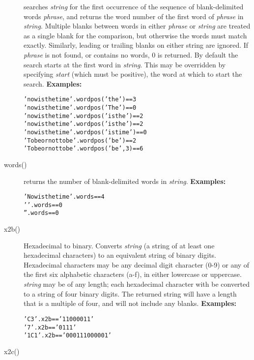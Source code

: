 \begin{description}
searches \emph{string} for the first occurrence of the sequence
of blank-delimited words \emph{phrase}, and returns the word number
of the first word of \emph{phrase} in \emph{string}.  Multiple
blanks between words in either \emph{phrase} or \emph{string}
are treated as a single blank for the comparison, but otherwise the
words must match exactly.  Similarly, leading or trailing blanks on
either string are ignored.
If \emph{phrase} is not found, or contains no words, 0 is returned.
 By default the search starts at the first word in \emph{string}.
This may be overridden by specifying \emph{start} (which must be
positive), the word at which to start the search.
 \textbf{Examples:}
\begin{alltt}
'now is the time'.wordpos('the')       == 3
'now is the time'.wordpos('The')       == 0
'now is the time'.wordpos('is the')    == 2
'now is the time'.wordpos('is    the') == 2
'now is the time'.wordpos('is  time')  == 0
'To be or not to be'.wordpos('be')     == 2
'To be or not to be'.wordpos('be',3)   == 6
\end{alltt}
\item[words()]\label{refwords}

returns the number of blank-delimited words in \emph{string}.
 \textbf{Examples:}
\begin{alltt}
'Now is the time'.words == 4
' '.words               == 0
''.words                == 0
\end{alltt}
\item[x2b()]\label{refx2b}

Hexadecimal to binary.
Converts \emph{string} (a string of at least one hexadecimal
characters) to an equivalent string of binary digits.
Hexadecimal characters may be any decimal digit character (0-9) or any
of the first six alphabetic characters (a-f), in either lowercase or
uppercase.
 \emph{string} may be of any length; each hexadecimal character
with be converted to a string of four binary digits.
The returned string will have a length that is a multiple of four, and
will not include any blanks.
 \textbf{Examples:}
\begin{alltt}
'C3'.x2b  == '11000011'
'7'.x2b   == '0111'
'1C1'.x2b == '000111000001'
\end{alltt}
\item[x2c()]\label{refx2c}


\end{description}
